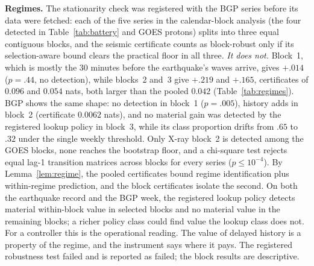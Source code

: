 \documentclass[acmsmall,screen,review,anonymous]{acmart}
\begin{document}
\textbf{Regimes.} The stationarity check was registered with the BGP
series before its data were fetched: each of the five series in the
calendar-block analysis (the four detected in Table~\ref{tab:battery}
and GOES protons) splits into three equal contiguous blocks, and the
seismic certificate counts as block-robust only if its selection-aware
bound clears the practical floor in all three. \emph{It does not.} Block~1,
which is mostly the 30 minutes before the earthquake's waves arrive, gives
$+.014$ ($p=.44$, no detection), while blocks~2 and~3 give $+.219$ and
$+.165$, certificates of $0.096$ and $0.054$ nats, both larger than the
pooled $0.042$ (Table~\ref{tab:regimes}). BGP shows the same shape: no
detection in block~1 ($p=.005$), history adds in block~2 (certificate
$0.0062$ nats), and no material gain was detected by the registered lookup policy in block~3, while its class proportion drifts
from $.65$ to $.32$ under the single weekly threshold. Only X-ray block~2 is
detected among the GOES blocks, none reaches the bootstrap floor, and a chi-square test
rejects equal lag-1 transition matrices across blocks for every series
($p\le10^{-4}$). By Lemma~\ref{lem:regime}, the pooled certificates bound
regime identification plus within-regime prediction, and the block
certificates isolate the second. On both the earthquake record and the
BGP week, the registered lookup policy detects material within-block value
in selected blocks and no material value in the remaining blocks; a richer
policy class could find value the lookup class does not. For a controller
this is the operational reading. The value of
delayed history is a property of the regime, and the instrument says
where it pays. The registered robustness test failed and is reported as
failed; the block results are descriptive.
\end{document}
